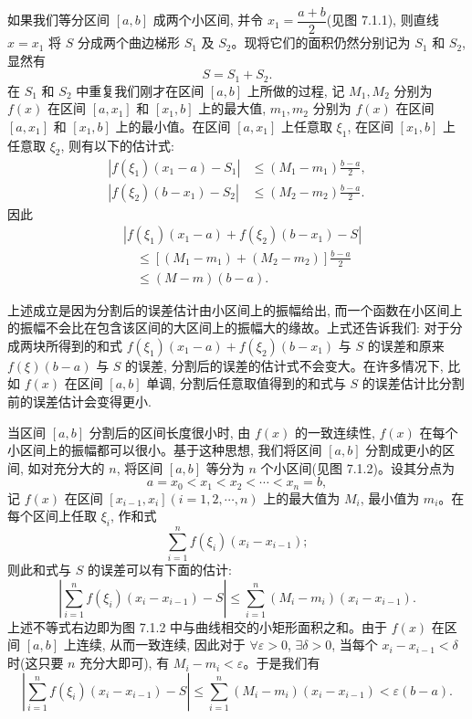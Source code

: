 如果我们等分区间 $[a,b]$ 成两个小区间, 并令 $x_1=\dfrac{a+b}{2}$(见图 7.1.1), 则直线 $x=x_1$ 将 $S$ 分成两个曲边梯形 $S_1$ 及 $S_2$。现将它们的面积仍然分别记为 $S_1$ 和 $S_2$, 显然有
\[
  S=S_1+S_2.
\]
在 $S_1$ 和 $S_2$ 中重复我们刚才在区间 $[a,b]$ 上所做的过程, 记 $M_1,M_2$ 分别为 $f(x)$ 在区间 $[a,x_1]$ 和 $[x_1,b]$ 上的最大值, $m_1,m_2$ 分别为 $f(x)$ 在区间 $[a,x_1]$ 和 $[x_1,b]$ 上的最小值。在区间 $[a,x_1]$ 上任意取 $\xi_1$, 在区间 $[x_1,b]$ 上任意取 $\xi_2$, 则有以下的估计式:
\[
\begin{aligned}
  |f(\xi_1)(x_1-a)-S_1|&\leq (M_1-m_1)\frac{b-a}{2},\\
  |f(\xi_2)(b-x_1)-S_2|&\leq (M_2-m_2)\frac{b-a}{2}.
\end{aligned}
\]
因此
\[
\begin{aligned}
  &|f(\xi_1)(x_1-a)+f(\xi_2)(b-x_1)-S|\\
  &\quad\leq [(M_1-m_1)+(M_2-m_2)]\frac{b-a}{2}\\
  &\quad\leq (M-m)(b-a).
\end{aligned}
\]

上述成立是因为分割后的误差估计由小区间上的振幅给出, 而一个函数在小区间上的振幅不会比在包含该区间的大区间上的振幅大的缘故。上式还告诉我们: 对于分成两块所得到的和式 $f(\xi_1)(x_1-a)+f(\xi_2)(b-x_1)$ 与 $S$ 的误差和原来 $f(\xi)(b-a)$ 与 $S$ 的误差, 分割后的误差的估计式不会变大。在许多情况下, 比如 $f(x)$ 在区间 $[a,b]$ 单调, 分割后任意取值得到的和式与 $S$ 的误差估计比分割前的误差估计会变得更小.

当区间 $[a,b]$ 分割后的区间长度很小时, 由 $f(x)$ 的一致连续性, $f(x)$ 在每个小区间上的振幅都可以很小。基于这种思想, 我们将区间 $[a,b]$ 分割成更小的区间, 如对充分大的 $n$, 将区间 $[a,b]$ 等分为 $n$ 个小区间(见图 7.1.2)。设其分点为
\[
  a=x_0<x_1<x_2<\cdots<x_n=b,
\]
记 $f(x)$ 在区间 $[x_{i-1},x_i](i=1,2,\cdots,n)$ 上的最大值为 $M_i$, 最小值为 $m_i$。在每个区间上任取 $\xi_i$, 作和式
\[
  \sum_{i=1}^n f(\xi_i)(x_i-x_{i-1});
\]
则此和式与 $S$ 的误差可以有下面的估计:
\begin{equation}
  \left|\sum_{i=1}^n f(\xi_i)(x_i-x_{i-1})-S\right|
  \leq \sum_{i=1}^n (M_i-m_i)(x_i-x_{i-1}).
  \label{eq:ma-7-1-1}
\end{equation}
上述不等式右边即为图 7.1.2 中与曲线相交的小矩形面积之和。由于 $f(x)$ 在区间 $[a,b]$ 上连续, 从而一致连续, 因此对于 $\forall\varepsilon>0$, $\exists\delta>0$, 当每个 $x_i-x_{i-1}<\delta$ 时(这只要 $n$ 充分大即可), 有 $M_i-m_i<\varepsilon$。于是我们有
\[
  \left|\sum_{i=1}^n f(\xi_i)(x_i-x_{i-1})-S\right|
  \leq \sum_{i=1}^n (M_i-m_i)(x_i-x_{i-1})<\varepsilon(b-a).
\]


